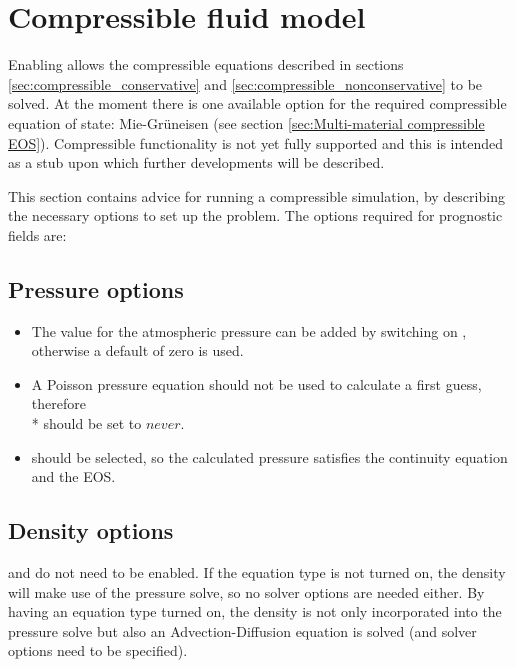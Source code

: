 \section{Compressible fluid model}

Enabling  allows the compressible equations described in sections 
\ref{sec:compressible_conservative} and \ref{sec:compressible_nonconservative} to be solved. At the moment there is one available option for the required 
compressible equation of state: Mie-Gr\"uneisen (see section \ref{sec:Multi-material compressible EOS}).  Compressible functionality is not yet fully supported and this is intended as a stub upon which further developments will be described.

This section contains advice for running a compressible simulation, by describing the necessary options to set up the problem. The options required for prognostic fields are:

\subsection{Pressure options}
\begin{itemize}
\item The value for the atmospheric pressure can be added by switching on , otherwise a default of zero is used.
\item A Poisson pressure equation should not be used to calculate a first guess, therefore \\*  should be set to $never$.
\item {} should be selected, so the calculated pressure satisfies the continuity equation and the EOS.
\end{itemize}

\subsection{Density options}
 and  do not need to be enabled. If the equation type is not turned on, the density will make 
use of the pressure solve, so no solver options are needed either. By having an equation type turned on, the density is not only incorporated into the pressure solve 
but also an Advection-Diffusion equation is solved (and solver options need to be specified).


